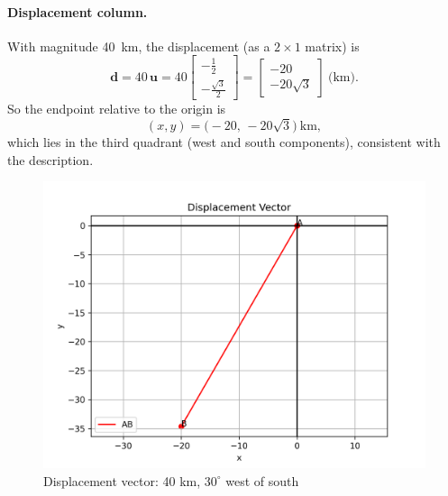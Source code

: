 \documentclass[12pt]{article}
\begin{document}
\paragraph{Displacement column.}
With magnitude \SI{40}{km}, the displacement (as a $2\times 1$ matrix) is
\[
\mathbf{d}
=
40\,
\mathbf{u}
=
40\begin{bmatrix}
-\tfrac{1}{2}\\[2pt]
-\tfrac{\sqrt{3}}{2}
\end{bmatrix}
=
\begin{bmatrix}
-20\\[2pt]
-20\sqrt{3}
\end{bmatrix}
\ \text{(km)}.
\]
So the endpoint relative to the origin is
\[
(x,y)=\bigl(-20,\,-20\sqrt{3}\bigr)\ \text{km},
\]
which lies in the third quadrant (west and south components), consistent with the description.


\begin{center}
\end{center}

\begin{figure}[h!]
    \centering
    \includegraphics[width=0.65\linewidth]{figs/fig.png}
    \caption{Displacement vector: 40 km, $30^{\circ}$ west of south}
\end{figure}
\end{document}

